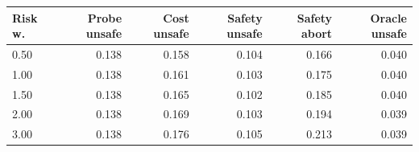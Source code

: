 \begin{tabular}{lrrrrr}
\toprule
Risk w. & Probe unsafe & Cost unsafe & Safety unsafe & Safety abort & Oracle unsafe \\
\midrule
0.50 & 0.138 & 0.158 & 0.104 & 0.166 & 0.040 \\
1.00 & 0.138 & 0.161 & 0.103 & 0.175 & 0.040 \\
1.50 & 0.138 & 0.165 & 0.102 & 0.185 & 0.040 \\
2.00 & 0.138 & 0.169 & 0.103 & 0.194 & 0.039 \\
3.00 & 0.138 & 0.176 & 0.105 & 0.213 & 0.039 \\
\bottomrule
\end{tabular}
